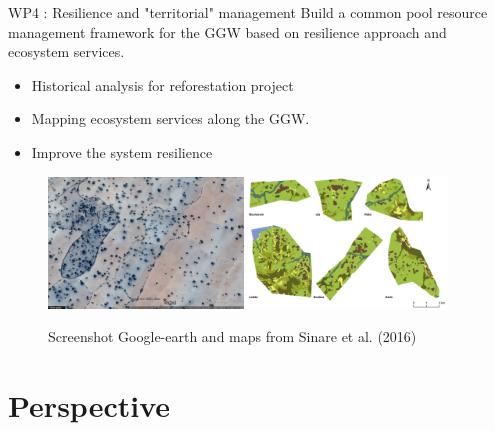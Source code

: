 \documentclass[newPxFont]{beamer}
\begin{document}
\begin{frame}[c]{WP4 : Resilience and "territorial" management}
\vspace{-2em}
Build a common pool resource management framework for the GGW based on resilience approach and ecosystem services.
\begin{itemize}
  \item Historical analysis for reforestation project
  \item Mapping ecosystem services along the GGW.
  \item Improve the system resilience
\end{itemize}
\begin{figure}
	\centering
	\includegraphics[height = 3.5cm]{img/ggearth}
  \includegraphics[height = 3.5cm]{img/Sinare_et_al2016}
  \caption{\small{Screenshot Google-earth and maps from Sinare et al. (2016)}}
\end{figure}
\end{frame}

\section{Perspective}
\end{document}
